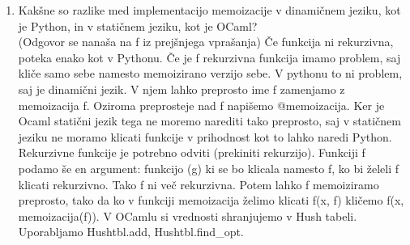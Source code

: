\documentclass[a4paper]{article}
\begin{document}
\begin{enumerate}
        \item Kakšne so razlike med implementacijo memoizacije v dinamičnem jeziku, kot je Python, in v statičnem jeziku, kot je OCaml?\\
        (Odgovor se nanaša na f iz prejšnjega vprašanja)
        Če funkcija ni rekurzivna, poteka enako kot v Pythonu.
        Če je f rekurzivna funkcija imamo problem, saj kliče samo sebe namesto memoizirano verzijo sebe. V pythonu to ni problem, saj je dinamični jezik. V njem lahko preprosto ime f zamenjamo z memoizacija f. Oziroma preprosteje nad f napišemo @memoizacija.
        Ker je Ocaml statični jezik tega ne moremo narediti tako preprosto, saj v statičnem jeziku ne moramo klicati funkcije v prihodnost kot to lahko naredi Python. Rekurzivne funkcije je potrebno odviti (prekiniti rekurzijo). Funkciji f podamo še en argument: funkcijo (g) ki se bo klicala namesto f, ko bi želeli f klicati rekurzivno. Tako f ni več rekurzivna. Potem lahko f memoiziramo preprosto, tako da ko v funkciji memoizacija želimo klicati f(x, f) kličemo f(x, memoizacija(f)). V OCamlu si vrednosti shranjujemo v Hush tabeli. Uporabljamo Hushtbl.add, Hushtbl.find\_opt.

    \end{enumerate}
\end{document}
